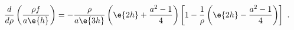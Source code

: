 \begin{equation}
\label{f_eq}
  \frac{d}{d\rho} \left(\frac{\rho f}{a \e{h}}\right) =
  -\frac{\rho}{a\e{3h}} \left(\e{2h} +\frac{a^2-1}4 \right) 
  \left[ 1-\frac1\rho \left( \e{2h} -\frac{a^2-1}4 \right) \right]~.
\end{equation}

